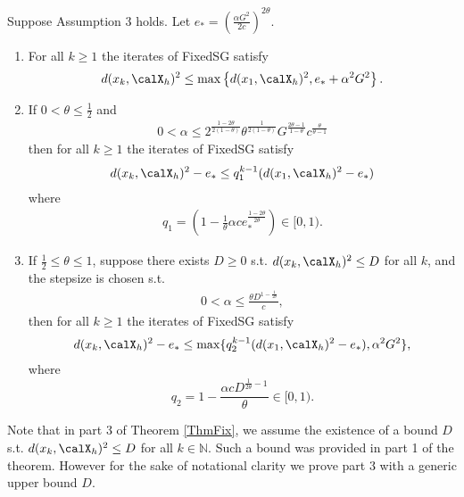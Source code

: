 \documentclass[smallextended]{svjour3}
\begin{document}
 \begin{theorem}\label{ThmFix}
Suppose Assumption 3 holds. Let $e_* = \left(\frac{\alpha G^2}{2c}\right)^{2\theta}$. 
 \begin{enumerate}
 \item For all $k\geq 1$  the iterates of FixedSG satisfy
 \begin{eqnarray}\label{eqBounded}
 d(x_k,\calX_h)^2\leq \max\left\{d(x_1,\calX_h)^2,e_* + \alpha^2 G^2\right\}.
 \end{eqnarray}
 \item If $0<\theta\leq \frac{1}{2}$ 
 and
 \begin{eqnarray}\label{fixed0}
 0<\alpha 
 \leq 
 2^{\frac{1-2\theta}{2(1-\theta)}}\theta^{\frac{1}{2(1-\theta)}}
 G^{\frac{2\theta-1}{1-\theta}}
 c^{\frac{\theta}{\theta-1}}
 \end{eqnarray}
then
 for all $k\geq 1$ the iterates of FixedSG satisfy
 \begin{eqnarray}\label{fixed1}
d(x_k,\calX_h)^2 - e_*\leq q_1^{k-1}
(d(x_1,\calX_h)^2-e_*)
 \end{eqnarray}
 where
 \begin{eqnarray}\label{fixed2}
 q_1=\left(1-\frac{1}{\theta}\alpha c e_*^{\frac{1-2\theta}{2\theta}}\right)\in[0,1).
 \end{eqnarray}

 \item If  $\frac{1}{2}\leq\theta\leq 1$, suppose there exists $D\geq 0$ s.t.  $d(x_k,\calX_h)^2\leq D$ for all $k$, and the stepsize is chosen s.t.
 \begin{eqnarray}\label{linConv}
 0<\alpha\leq  \frac{\theta D^{1-\frac{1}{2\theta}}}{c},
 \end{eqnarray}
 then for all $k\geq 1$ the iterates of FixedSG satisfy
 \begin{eqnarray}\label{ghh}
 d(x_k,\calX_h)^2 - e_*\leq \max\{q_2^{k-1}(d(x_1,\calX_h)^2-e_*),\alpha^2 G^2\},
 \end{eqnarray}
 where
 $$
 q_2=
1-\frac{\alpha c D^{\frac{1}{2\theta}-1}}{\theta}\in[0,1).
 $$
 \end{enumerate}
 \end{theorem}
Note that in part 3 of Theorem \ref{ThmFix}, we assume the existence of a bound $D$ s.t. $d(x_k,\calX_h)^2\leq D$ for all $k\in\mathbb{N}$. Such a bound was provided in part 1 of the theorem. However for the sake of notational clarity we prove part 3 with a generic upper bound $D$. 
\end{document}

